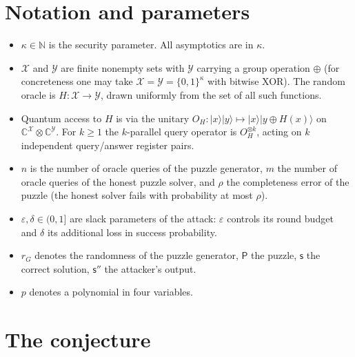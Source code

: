 \documentclass{conjura-conjecture}
\newcommand{\puz}{\mathsf{P}}
\newcommand{\solu}{\mathsf{s}}
\newcommand{\solatt}{\mathsf{s}''}
\begin{document}
\section{Notation and parameters}\label{sec:notation}

\begin{itemize}
  \item $\kappa \in \mathbb{N}$ is the security parameter. All asymptotics
    are in $\kappa$.
  \item $\mathcal{X}$ and $\mathcal{Y}$ are finite nonempty sets with
    $\mathcal{Y}$ carrying a group operation $\oplus$ (for concreteness one
    may take $\mathcal{X} = \mathcal{Y} = \{0,1\}^{\kappa}$ with bitwise
    XOR). The random oracle is $H \colon \mathcal{X} \to \mathcal{Y}$,
    drawn uniformly from the set of all such functions.
  \item Quantum access to $H$ is via the unitary
    $O_H \colon |x\rangle|y\rangle \mapsto |x\rangle|y \oplus H(x)\rangle$
    on $\mathbb{C}^{\mathcal{X}} \otimes \mathbb{C}^{\mathcal{Y}}$. For
    $k \ge 1$ the $k$-parallel query operator is $O_H^{\otimes k}$, acting
    on $k$ independent query/answer register pairs.
  \item $n$ is the number of oracle queries of the puzzle generator, $m$
    the number of oracle queries of the honest puzzle solver, and $\rho$
    the completeness error of the puzzle (the honest solver fails with
    probability at most $\rho$).
  \item $\varepsilon, \delta \in (0,1]$ are slack parameters of the
    attack: $\varepsilon$ controls its round budget and $\delta$ its
    additional loss in success probability.
  \item $r_G$ denotes the randomness of the puzzle generator, $\puz$ the
    puzzle, $\solu$ the correct solution, $\solatt$ the attacker's output.
  \item $p$ denotes a polynomial in four variables.
\end{itemize}

\section{The conjecture}\label{sec:conjectures}
\end{document}
